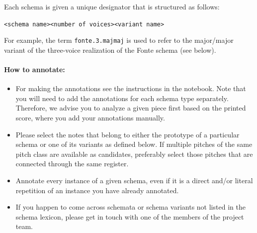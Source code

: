 ﻿\documentclass[11pt, openany]{article}
\begin{document}
Each schema is given a unique designator that is structured as follows:
\begin{center}
\texttt{<schema name><number of voices><variant name>}
\end{center}
For example, the term \texttt{fonte.3.majmaj} is used to refer to the major/major variant of the three-voice realization of the Fonte schema (see below).

\paragraph{How to annotate:\\}
\begin{itemize}
\item For making the annotations see the instructions in the notebook. Note that you will need to add the annotations for each schema type separately. Therefore, we advise you to analyze a given piece first based on the printed score, where you add your annotations manually.
\item Please select the notes that belong to either the prototype of a particular schema or one of its variants as defined below.
If multiple pitches of the same pitch class are available as candidates, preferably select those pitches that are connected through the same register.
\item Annotate every instance of a given schema, even if it is a direct and/or literal repetition of an instance you have already annotated.
\item If you happen to come across schemata or schema variants not listed in the schema lexicon, please get in touch with one of the members of the project team.
\end{itemize}
\end{document}
